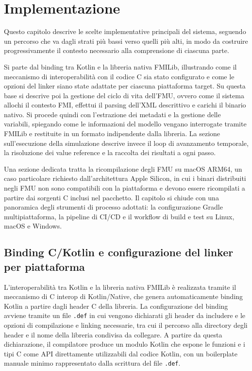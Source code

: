 \chapter{Implementazione}
\label{chap:implementazione}

Questo capitolo descrive le scelte implementative principali del sistema, seguendo un percorso che va dagli strati più bassi verso quelli più alti, in modo da costruire progressivamente il contesto necessario alla comprensione di ciascuna parte.

Si parte dal binding tra Kotlin e la libreria nativa FMILib, illustrando come il meccanismo di interoperabilità con il codice C sia stato configurato e come le opzioni del linker siano state adattate per ciascuna piattaforma target. Su questa base si descrive poi la gestione del ciclo di vita dell'FMU, ovvero come il sistema allochi il contesto FMI, effettui il parsing dell'XML descrittivo e carichi il binario nativo. Si procede quindi con l'estrazione dei metadati e la gestione delle variabili, spiegando come le informazioni del modello vengano interrogate tramite FMILib e restituite in un formato indipendente dalla libreria. La sezione sull'esecuzione della simulazione descrive invece il loop di avanzamento temporale, la risoluzione dei value reference e la raccolta dei risultati a ogni passo.

Una sezione dedicata tratta la ricompilazione degli FMU su macOS ARM64, un caso particolare richiesto dall'architettura Apple Silicon, in cui i binari distribuiti negli FMU non sono compatibili con la piattaforma e devono essere ricompilati a partire dai sorgenti C inclusi nel pacchetto. Il capitolo si chiude con una panoramica degli strumenti di processo adottati: la configurazione Gradle multipiattaforma, la pipeline di CI/CD e il workflow di build e test su Linux, macOS e Windows.

\section{Binding C/Kotlin e configurazione del linker per piattaforma}
\label{sec:impl-binding}

L'interoperabilità tra Kotlin e la libreria nativa FMILib è realizzata tramite il meccanismo di C interop di Kotlin/Native, che genera automaticamente binding Kotlin a partire dagli header C della libreria. La configurazione del binding avviene tramite un file \texttt{.def} in cui vengono dichiarati gli header da includere e le opzioni di compilazione e linking necessarie, tra cui il percorso alla directory degli header e il nome della libreria condivisa da collegare. A partire da questa dichiarazione, il compilatore produce un modulo Kotlin che espone le funzioni e i tipi C come API direttamente utilizzabili dal codice Kotlin, con un boilerplate manuale minimo rappresentato dalla scrittura del file \texttt{.def}.

